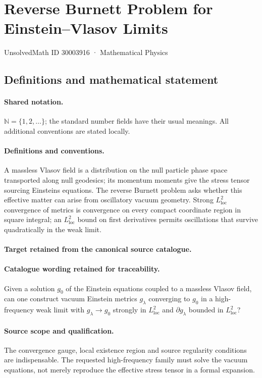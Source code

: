 \documentclass[11pt]{article}
\begin{document}
\setcounter{section}{30003915}
\section{Reverse Burnett Problem for Einstein–Vlasov Limits}\label{30003916}
{\small UnsolvedMath ID 30003916 · Mathematical Physics}
\subsection{Definitions and mathematical statement}

\paragraph{Shared notation.}$\mathbb N=\{1,2,\ldots\}$; the standard number fields have their usual meanings. All additional conventions are stated locally.


\paragraph{Definitions and conventions.}
A massless Vlasov field is a distribution on the null particle phase space transported along null geodesics; its momentum moments give the stress tensor sourcing Einstein\textquotesingle s equations. The reverse Burnett problem asks whether this effective matter can arise from oscillatory vacuum geometry. Strong $L^2_{\mathrm{loc}}$ convergence of metrics is convergence on every compact coordinate region in square integral; an $L^2_{\mathrm{loc}}$ bound on first derivatives permits oscillations that survive quadratically in the weak limit.

\paragraph{Target retained from the canonical source catalogue.}
\paragraph{Catalogue wording retained for traceability.}
Given a solution $g_0$ of the Einstein equations coupled to a massless Vlasov field, can one construct vacuum Einstein metrics $g_\lambda$ converging to $g_0$ in a high-frequency weak limit with $g_\lambda\to g_0$ strongly in $L^2_{\mathrm{loc}}$ and $\partial g_\lambda$ bounded in $L^2_{\mathrm{loc}}$?

\paragraph{Source scope and qualification.}
The convergence gauge, local existence region and source regularity conditions are indispensable. The requested high-frequency family must solve the vacuum equations, not merely reproduce the effective stress tensor in a formal expansion.
\end{document}
